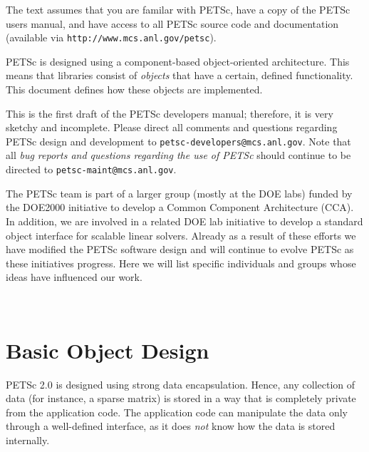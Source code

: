 The text assumes
that you are familar with PETSc, have a copy of the PETSc users
manual, and have access to all PETSc source code and documentation
(available via {\tt http://www.mcs.anl.gov/petsc}).

PETSc is designed using a component-based object-oriented
architecture. This means that libraries consist of {\em objects} that
have a certain, defined functionality. This document defines how these
objects are implemented.

\vspace{1cm}

This is the first draft of the PETSc developers manual;
therefore, it is very sketchy and incomplete. Please
direct all comments and questions regarding PETSc design and
development to {\tt petsc-developers@mcs.anl.gov}.  Note that all {\em
bug reports and questions regarding the use of PETSc} should continue
to be directed to {\tt petsc-maint@mcs.anl.gov}.

The PETSc team is part of a larger group (mostly at the DOE labs) funded by 
the DOE2000 initiative to develop a Common Component Architecture (CCA). In 
addition,
we are involved in a related DOE lab initiative to develop a standard object 
interface for scalable linear solvers.  Already as a result of these efforts
we have modified the PETSc software design and will continue to evolve PETSc as
these initiatives progress. Here we will list specific individuals and groups
whose ideas have influenced our work. 

%
%

\newpage
\hbox{ }
\newpage


\chapter{Basic Object Design}
\label{chapter:design}

PETSc 2.0 is designed using strong data encapsulation.  Hence,
any collection of data (for instance, a sparse matrix) is stored in 
a way that is completely private from the application code. The application 
code can manipulate the data only through a well-defined interface, as it 
does {\em not} know how the data is stored internally. 

